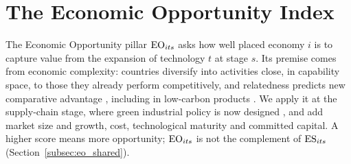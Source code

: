 \FloatBarrier
\section{The Economic Opportunity Index}\label{sec:eo}\label{sec:economic_opportunity}

The Economic Opportunity pillar $\mathrm{EO}_{its}$ asks how well placed economy $i$ is to capture value
from the expansion of technology $t$ at stage $s$. Its premise comes from economic complexity:
countries diversify into activities close, in capability space, to those they already perform
competitively, and relatedness predicts new comparative advantage
\citep{hidalgo2007product,hausmann2006structural,hausmann2014atlas,hidalgo2009building,hausmann2022implied,hidalgo2021economic,hausmann2007what},
including in low-carbon products \citep{mealy2022economic,growthlab2024greenplexity}. We apply it
at the supply-chain stage, where green industrial policy is now designed
\citep{rodrik2014green,juhasz2024new}, and add market size and growth, cost, technological
maturity and committed capital. A higher score means more opportunity; $\mathrm{EO}_{its}$ is not the
complement of $\mathrm{ES}_{its}$ (Section~\ref{subsec:eo_shared}).


